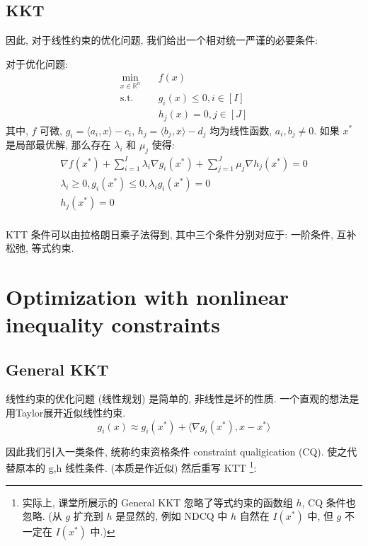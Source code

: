 \newpage

\subsection{KKT}

因此, 对于线性约束的优化问题, 我们给出一个相对统一严谨的必要条件:
\begin{theorem}
对于优化问题:
\begin{align*}
    \min_{x \in \mathbb{R}^n} & \quad f(x) \\
    \text{s.t.} & \quad g_i(x) \leq 0, i\in [I] \\
    & \quad h_j(x) = 0, j\in [J]
\end{align*}
其中, $f$ 可微, $g_i = \langle a_i,x \rangle-c_i$, $h_j = \langle b_j,x \rangle - d_j$ 均为线性函数, $a_i,b_j \neq 0$.
如果 $x^*$ 是局部最优解, 那么存在 $\lambda_i $ 和 $\mu_j$ 使得:
\begin{align*}
    \nabla f(x^*) + \sum_{i=1}^I \lambda_i \nabla g_i(x^*) + \sum_{j=1}^J \mu_j \nabla h_j(x^*) = 0 \\
    \lambda_i \geq 0, g_i(x^*) \leq 0, \lambda_ig_i(x^*) = 0 \\
    h_j(x^*) = 0 \\
\end{align*}
\end{theorem}
\begin{note}
    KTT 条件可以由拉格朗日乘子法得到, 其中三个条件分别对应于: 一阶条件, 互补松弛, 等式约束.
    \end{note}

\section{Optimization with nonlinear inequality constraints}
\subsection{General KKT}
线性约束的优化问题 (线性规划) 是简单的, 非线性是坏的性质. 一个直观的想法是用Taylor展开近似线性约束.
$$g_i(x)\approx g_i(x^*)+\langle\nabla g_i(x^*),x-x^*\rangle$$

\clearpage
因此我们引入一类条件, 统称约束资格条件 constraint qualigication (CQ). 使之代替原本的 g,h 线性条件. (本质是作近似) 然后重写 KTT \footnote{实际上, 课堂所展示的 General KKT 忽略了等式约束的函数组 $h$, CQ 条件也忽略. (从 $g$ 扩充到 $h$ 是显然的, 例如 NDCQ 中 $h$ 自然在 $I(x^*)$ 中, 但 $g$ 不一定在 $I(x^*)$ 中.)}:

